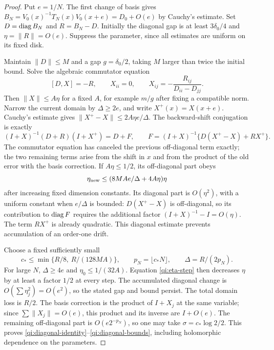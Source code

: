 \begin{proof}
Put $e=1/N$. The first change of basis gives
$B_N=V_0(x)^{-1}T_N(x)V_0(x+e)=D_0+O(e)$ by Cauchy's estimate.
Set $D=\operatorname{diag} B_N$ and $R=B_N-D$.
Initially the diagonal gap is at least $3\delta_0/4$ and
$\eta=\|R\|=O(e)$. Suppress the parameter, since all estimates are uniform on its fixed disk.

Maintain $\|D\|\le M$ and a gap $g=\delta_0/2$, taking $M$ larger than twice the initial bound. Solve the algebraic commutator equation
\[
 [D,X]=-R,\qquad X_{ii}=0,\qquad
 X_{ij}=-\frac{R_{ij}}{D_{ii}-D_{jj}}.
\]
Then $\|X\|\le A\eta$ for a fixed $A$, for example $m/g$ after fixing a compatible norm. Narrow the current domain by $\Delta\ge2e$, and write $X^+(x)=X(x+e)$. Cauchy's estimate gives
$\|X^+-X\|\le2A\eta e/\Delta$. The backward-shift conjugation is exactly
\begin{equation}\label{qi:one-step}
 (I+X)^{-1}(D+R)(I+X^+)=D+F,\qquad
 F=(I+X)^{-1}\{D(X^+-X)+RX^+\}.
\end{equation}
The commutator equation has canceled the previous off-diagonal
term exactly; the two remaining terms arise from the shift in $x$
and from the product of the old error with the basis correction. If $A\eta\le1/2$, its off-diagonal part obeys
\begin{equation}\label{qi:eta-step}
 \eta_{\rm new}\le
       (8MAe/\Delta+4A\eta)\eta
\end{equation}
after increasing fixed dimension constants. Its diagonal part is
$O(\eta^2)$, with a uniform constant when $e/\Delta$ is bounded:
$D(X^+-X)$ is off-diagonal, so its contribution to $\operatorname{diag} F$ requires the additional factor $(I+X)^{-1}-I=O(\eta)$.
The term $RX^+$ is already quadratic. This diagonal estimate prevents accumulation of an order-one drift.

Choose a fixed sufficiently small
\[
 c_*\le\min\{R/8,\ R/(128MA)\},\qquad
 p_N=\lfloor c_*N\rfloor,\qquad \Delta=R/(2p_N).
\]
For large $N$, $\Delta\ge4e$ and $\eta_0\le1/(32A)$.
Equation \eqref{qi:eta-step} then decreases $\eta$ by at least a factor $1/2$ at every step. The accumulated diagonal change is
$O(\sum\eta_j^2)=O(e^2)$, so the stated gap and bound persist.
The total domain loss is $R/2$. The basis correction is the product of $I+X_j$ at the same variable; since
$\sum\|X_j\|=O(e)$, this product and its inverse are $I+O(e)$.
The remaining off-diagonal part is $O(e2^{-p_N})$, so one may take
$\sigma=c_*\log2/2$. This proves \eqref{qi:diagonal-identity}--\eqref{qi:diagonal-bounds}, including holomorphic dependence on the parameters.
\end{proof}

